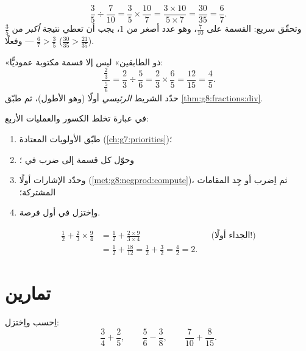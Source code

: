 \begin{example}\label{ex:g8:fractions:div}
\[
\frac{3}{5} \div \frac{7}{10}
= \frac{3}{5} \times \frac{10}{7}
= \frac{3 \times 10}{5 \times 7}
= \frac{30}{35} = \frac{6}{7}.
\]
وتحقّق سريع: القسمة على $\frac{7}{10}$، وهو عدد أصغر من
$1$، يجب أن تعطي نتيجة \emph{أكبر} من $\frac35$ --- وفعلًا
$\frac67 > \frac35$ ($\frac{30}{35} > \frac{21}{35}$).
\end{example}

\begin{example}\label{ex:g8:fractions:complex}
 «ذو الطابقين» ليس إلا قسمة مكتوبة عموديًّا:
\[
\frac{\ \frac{2}{3}\ }{\ \frac{5}{6}\ }
= \frac{2}{3} \div \frac{5}{6}
= \frac{2}{3} \times \frac{6}{5}
= \frac{12}{15} = \frac{4}{5}.
\]
حدّد الشريط \emph{الرئيسي} أولًا (وهو الأطول)، ثم طبّق
\cref{thm:g8:fractions:div}.
\end{example}

\begin{method}\label{met:g8:fractions:mixed}
في عبارة تخلط الكسور والعمليات الأربع:
\begin{enumerate}
  \item طبّق الأولويات المعتادة (\cref{ch:g7:priorities})؛
  \item وحوّل كل قسمة إلى ضرب في ؛
  \item وحدّد الإشارات أولًا (\cref{met:g8:negprod:compute})، ثم
        اِضرب أو جِد المقامات المشتركة؛
  \item واِختزل في أول فرصة.
\end{enumerate}
\end{method}

\begin{example}\label{ex:g8:fractions:mixed}
\begin{align*}
\frac12 + \frac{2}{3} \times \frac{9}{4}
&= \frac12 + \frac{2 \times 9}{3 \times 4}
&& \text{(الجداء أولًا!)} \\
&= \frac12 + \frac{18}{12} = \frac12 + \frac32
= \frac{4}{2} = 2 .
\end{align*}
\end{example}

\section{تمارين}

\begin{exercise}[$\star$]\label{exo:g8:fractions:1}
اِحسب واِختزل:
\[
\frac{3}{4} + \frac{2}{5}, \qquad
\frac{5}{6} - \frac{3}{8}, \qquad
\frac{7}{10} + \frac{8}{15} .
\]
\end{exercise}

